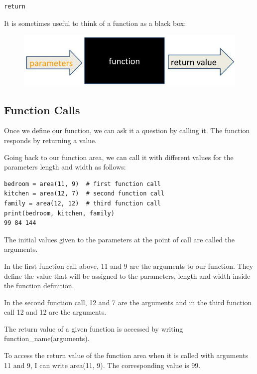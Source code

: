 \documentclass{article}
\begin{document}
\begin{lstlisting}
return
\end{lstlisting}

It is sometimes useful to think of a function as a black box:

\begin{figure}[h]
\includegraphics[scale=.5]{blackbox.jpg}\\
\end{figure}

\subsection{Function Calls}

Once we define our function, we can ask it  a question by calling it.  The function responds by returning a value.

Going back to our function area, we can call it with different values for the parameters length and width as follows: 

\begin{lstlisting}
bedroom = area(11, 9)  # first function call
kitchen = area(12, 7)  # second function call
family = area(12, 12)  # third function call
print(bedroom, kitchen, family) 
99 84 144

\end{lstlisting}

The initial values given to the parameters at the point of call are called the arguments.

In the first function call above,  11 and 9  are the arguments to our function.  They define the value that will be assigned to the parameters, length and width inside the function definition.

In the second function call,  12 and 7  are the arguments and in the third function call 12 and 12 are the arguments.

The return value of a given function is accessed by writing function{\_}name(arguments).

To access the return value of the function area when it is called with arguments 11 and 9, I can write area(11, 9).  The corresponding value is 99. 
\end{document}

